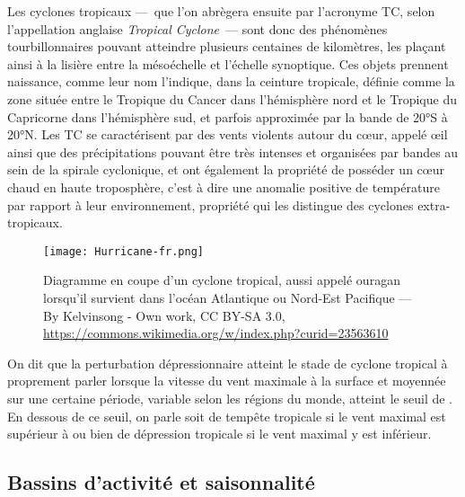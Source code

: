 \documentclass[../main.tex]{subfiles}
\begin{document}
Les cyclones tropicaux ---~que l'on abrègera ensuite par l'acronyme TC, selon l'appellation anglaise \textit{Tropical Cyclone}~--- sont donc des phénomènes
tourbillonnaires pouvant atteindre plusieurs centaines de kilomètres, les plaçant ainsi à la lisière entre la mésoéchelle et l'échelle synoptique. Ces objets
prennent naissance, comme leur nom l'indique, dans la ceinture tropicale, définie comme la zone située entre le Tropique du Cancer dans l'hémisphère nord et le
Tropique du Capricorne dans l'hémisphère sud, et parfois approximée par la bande de \ang{20}S à \ang{20}N. Les TC se caractérisent par des vents violents autour
du cœur, appelé œil ainsi que des précipitations pouvant être très intenses et organisées par bandes au sein de la spirale cyclonique, et ont également la
propriété de posséder un cœur chaud en haute troposphère, c'est à dire une anomalie positive de température par rapport à leur environnement, propriété qui les
distingue des cyclones extra-tropicaux.
%
\begin{figure}[tb]
    \centering
    \texttt{[image: Hurricane-fr.png]}
    \caption{Diagramme en coupe d'un cyclone tropical, aussi appelé ouragan lorsqu'il survient dans l'océan Atlantique ou Nord-Est Pacifique --- By Kelvinsong -
    Own work, CC BY-SA 3.0, \url{https://commons.wikimedia.org/w/index.php?curid=23563610}}
    \label{fig:diagramme_TC}
\end{figure}
%
On dit que la perturbation dépressionnaire atteint le stade de cyclone tropical à proprement parler lorsque la vitesse du vent maximale à la surface et moyennée
sur une certaine période, variable selon les régions du monde, atteint le seuil de . En dessous de ce seuil, on parle soit de tempête tropicale si le
vent maximal est supérieur à  ou bien de dépression tropicale si le vent maximal y est inférieur.

\subsection{Bassins d'activité et saisonnalité}\label{sec:bassins_saisons}
\end{document}
